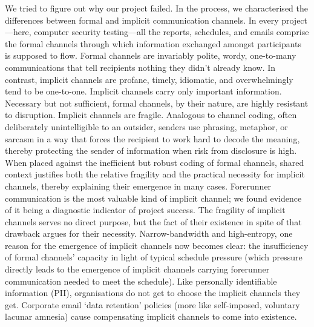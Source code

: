 We tried to figure out why our project failed. In the process, we
characterised the differences between formal and implicit communication
channels. In every project---here, computer security testing---all the reports,
schedules, and emails comprise the formal channels through which
information exchanged amongst participants is supposed to flow. Formal
channels are invariably polite, wordy, one-to-many communications that tell
recipients nothing they didn't already know. In contrast, implicit channels
are profane, timely, idiomatic, and overwhelmingly tend to be one-to-one.
Implicit channels carry only important information. Necessary but not
sufficient, formal channels, by their nature, are highly resistant to
disruption. Implicit channels are fragile. Analogous to channel coding,
often deliberately unintelligible to an outsider, senders use phrasing,
metaphor, or sarcasm in a way that forces the recipient to work hard to decode the
meaning, thereby protecting the sender of information when risk from disclosure
is high. When placed against the inefficient but robust coding of formal
channels, shared context justifies both the relative fragility and
the practical necessity for implicit channels, thereby explaining their
emergence in many cases. Forerunner communication is the most valuable kind of
implicit channel; we found evidence of it being a diagnostic indicator of
project success. The fragility of implicit channels serves no direct
purpose, but the fact of their existence in spite of that drawback argues
for their necessity. Narrow-bandwidth and high-entropy, one reason for the
emergence of implicit channels now becomes clear: the insufficiency of
formal channels' capacity in light of typical schedule pressure (which
pressure directly leads to the emergence of implicit channels carrying
forerunner communication needed to meet the schedule). Like personally
identifiable information (PII), organisations do not get to choose the implicit
channels they get. Corporate email `data retention' policies (more like self-imposed,
voluntary lacunar amnesia) cause compensating implicit channels to come
into existence.

